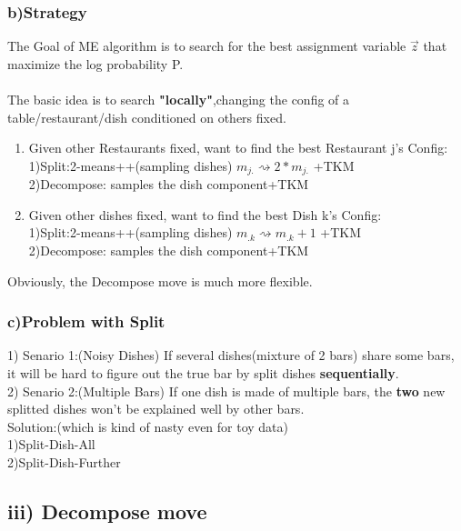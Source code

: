 \documentclass{article}
\begin{document}
\begin{spacing}{1.1}
\subsubsection{b)Strategy}
The Goal of ME algorithm is to search for the best assignment variable $\vec z$ that maximize the log probability P.\\ \\
The basic idea is to search {\bf "locally"},changing the config of a table/restaurant/dish conditioned on others fixed.\\
\begin{enumerate}
\item Given other Restaurants fixed, want to find the best Restaurant j's Config:\\
1)Split:2-means++(sampling dishes) $m_{j.}\rightsquigarrow 2*m_{j.}$ +TKM \\
2)Decompose: samples the dish component+TKM
\item Given other dishes fixed, want to find the best Dish k's Config:\\
1)Split:2-means++(sampling dishes) $m_{.k}\rightsquigarrow m_{.k}+1$ +TKM \\
2)Decompose: samples the dish component+TKM
\end{enumerate}
Obviously, the Decompose move is much more flexible.
\subsubsection{c)Problem with Split}
1) Senario 1:(Noisy Dishes) If several dishes(mixture of 2 bars) share some bars, it will be hard to figure out the true bar by split dishes {\bf sequentially}.\\
2) Senario 2:(Multiple Bars) If one dish is made of multiple bars, the {\bf two} new splitted dishes won't be explained well by other bars. \\
Solution:(which is kind of nasty even for toy data)\\
1)Split-Dish-All\\
2)Split-Dish-Further\\
\subsection{iii) Decompose move}

\end{spacing}
\end{document}
